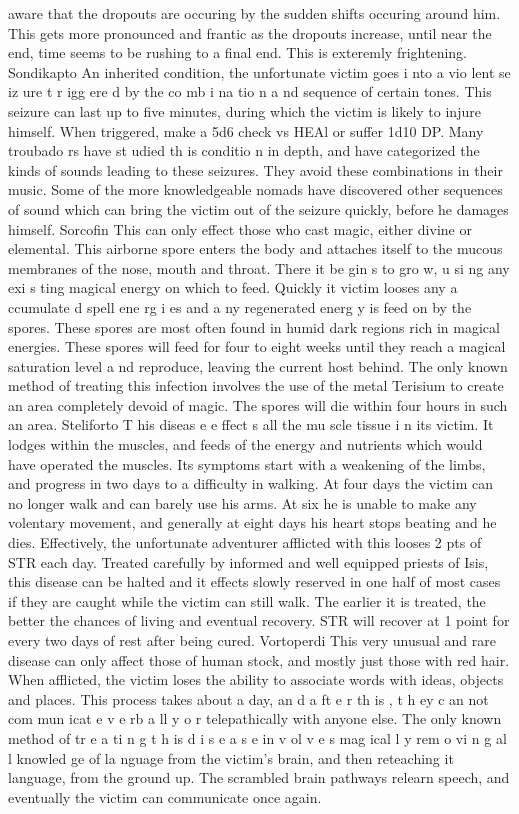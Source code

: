 \begin{multicols*}{2}
aware that the dropouts are occuring by the sudden shifts
occuring around him. This gets more pronounced and frantic
as the dropouts increase, until near the end, time seems to be
rushing to a final end. This is exteremly frightening.
Sondikapto
An inherited condition, the unfortunate victim goes
i nto a vio lent se iz ure t r igg ere d by the co mb i na tio n a nd
sequence of certain tones. This seizure can last up to five
minutes, during which the victim is likely to injure himself.
When triggered, make a 5d6 check vs HEAl or suffer 1d10
DP.
Many troubado rs have st udied th is conditio n in
depth, and have categorized the kinds of sounds leading to
these seizures. They avoid these combinations in their music.
Some of the more knowledgeable nomads have discovered
other sequences of sound which can bring the victim out of
the seizure quickly, before he damages himself.
Sorcofin
This can only effect those who cast magic, either
divine or elemental. This airborne spore enters the body and
attaches itself to the mucous membranes of the nose, mouth
and throat. There it be gin s to gro w, u si ng any exi s ting
magical energy on which to feed. Quickly it victim looses any
a ccumulate d spell ene rg i es and a ny regenerated energ y is
feed on by the spores.
These spores are most often found in humid dark
regions rich in magical energies. These spores will feed for
four to eight weeks until they reach a magical saturation level
a nd reproduce, leaving the current host behind. The only
known method of treating this infection involves the use of
the metal Terisium to create an area completely devoid of
magic. The spores will die within four hours in such an area.
Steliforto
T his diseas e e ffect s all the mu scle tissue i n its
victim. It lodges within the muscles, and feeds of the energy
and nutrients which would have operated the muscles. Its
symptoms start with a weakening of the limbs, and progress
in two days to a difficulty in walking. At four days the victim
can no longer walk and can barely use his arms. At six he is
unable to make any volentary movement, and generally at
eight days his heart stops beating and he dies. Effectively, the
unfortunate adventurer afflicted with this looses 2 pts of STR
each day.
Treated carefully by informed and well equipped
priests of Isis, this disease can be halted and it effects slowly
reserved in one half of most cases if they are caught while the
victim can still walk. The earlier it is treated, the better the
chances of living and eventual recovery. STR will recover at 1
point for every two days of rest after being cured.
Vortoperdi
This very unusual and rare disease can only affect
those of human stock, and mostly just those with red hair.
When afflicted, the victim loses the ability to associate words
with ideas, objects and places. This process takes about a day,
an d a ft e r th is , t h ey c an not com mun icat e v e rb a ll y o r
telepathically with anyone else. The only known method of
tr e a ti n g t h is d i s e a s e in v ol v e s mag ical l y rem o vi n g al l
knowled ge of la nguage from the victim’s brain, and then
reteaching it language, from the ground up. The scrambled
brain pathways relearn speech, and eventually the victim can
communicate once again.
\end{multicols*}